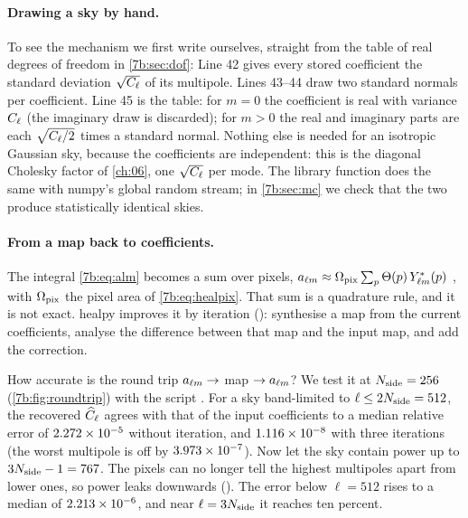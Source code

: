 \paragraph{Drawing a sky by hand.} To see the mechanism we first write
 ourselves, straight from the table of real degrees of freedom in \cref{7b:sec:dof}:
\noindent Line 42 gives every stored coefficient the standard deviation $\sqrt{C_\ell}$ of its
multipole. Lines 43--44 draw two standard normals per coefficient. Line 45 is the table: for
$m=0$ the coefficient is real with variance $C_\ell$ (the imaginary draw is discarded); for $m>0$
the real and imaginary parts are each $\sqrt{C_\ell/2}$ times a standard normal. Nothing else is
needed for an isotropic Gaussian sky, because the coefficients are independent: this is the
diagonal Cholesky factor of \cref{ch:06}, one $\sqrt{C_\ell}$ per mode. The library function
 does the same with numpy's global random stream; in \cref{7b:sec:mc} we
check that the two produce statistically identical skies.

\paragraph{From a map back to coefficients.} The integral \eqref{7b:eq:alm} becomes a sum over
pixels, $a_{\ell m}\approx\Omega_{\rm pix}\sum_p\Theta(p)\,Y^*_{\ell m}(p)$ , with
$\Omega_{\rm pix}$ the pixel area of \eqref{7b:eq:healpix}. That sum is a quadrature rule, and it
is not exact. healpy improves it by iteration (): synthesise a map from the current
coefficients, analyse the difference between that map and the input map, and add the correction.

How accurate is the round trip $a_{\ell m}\to$ map $\to a_{\ell m}$? We test it at $N_{\rm side}=256$
(\cref{7b:fig:roundtrip}) with the script
\allowbreak{}. For a sky band-limited to $\ell\le2N_{\rm side}=512$, the recovered
$\widehat{C}_\ell$ agrees with that of the input coefficients to a median relative error of $2.272\times10^{-5}$
without iteration, and $1.116\times10^{-8}$ with three iterations (the worst multipole is off by
$3.973\times10^{-7}$). Now let the sky contain power up to $3N_{\rm side}-1=767$. The pixels can no
longer tell the highest multipoles apart from lower ones, so power leaks downwards
(). The error below $\ell=512$ rises to a median of $2.213\times10^{-6}$, and near
$\ell=3N_{\rm side}$ it reaches ten percent.

